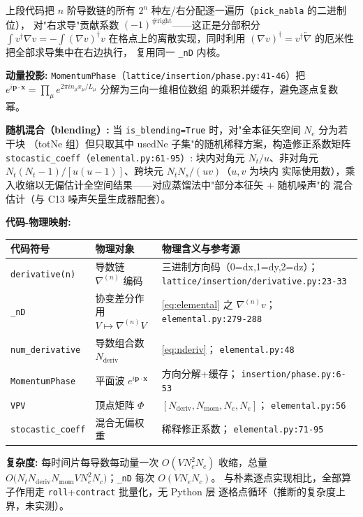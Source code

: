 \documentclass[UTF8]{ctexart}
\begin{document}
上段代码把 $n$ 阶导数链的所有 $2^n$ 种左/右分配逐一遍历（\texttt{pick\_nabla} 的二进制位），
对"右求导"贡献系数 $(-1)^{\#\text{right}}$——这正是分部积分
$\int v^\dagger \nabla v = -\int (\nabla v)^\dagger v$ 在格点上的离散实现，同时利用
$(\nabla v)^\dagger = v^\dagger \overleftarrow\nabla$ 的厄米性把全部求导集中在右边执行，
复用同一 \texttt{\_nD} 内核。

\textbf{动量投影:} \texttt{MomentumPhase}（\texttt{lattice/insertion/phase.py:41-46}）把
$e^{i\mathbf p\cdot\mathbf x} = \prod_\mu e^{2\pi i n_\mu x_\mu/L_\mu}$ 分解为三向一维相位数组
的乘积并缓存，避免逐点复数幂。

\textbf{随机混合（blending）:} 当 \texttt{is\_blending=True} 时，对"全本征矢空间 $N_e$ 分为若干块
（totNe 组）但只取其中 usedNe 子集"的随机稀释方案，构造修正系数矩阵
\texttt{stocastic\_coeff}（\texttt{elemental.py:61-95}）:
块内对角元 $N_t/u$、非对角元 $N_t(N_t-1)/[u(u-1)]$、跨块元 $N_tN_s/(uv)$（$u,v$ 为块内
实际使用数），乘入收缩以无偏估计全空间结果——对应蒸馏法中"部分本征矢 + 随机噪声"的
混合估计（与 C13 噪声矢量生成器配套）。

\begin{mapbox}
\textbf{代码-物理映射:}
\end{mapbox}
\begin{xltabular}{\textwidth}{llX}
\toprule
\textcolor{map}{代码符号} & 物理对象 & 物理含义与参考源 \\
\midrule
\endhead
\texttt{derivative(n)} & 导数链 $\nabla^{(n)}$ 编码 & 三进制方向码（0=dx,1=dy,2=dz）；
  \texttt{\nolinkurl{lattice/insertion/derivative.py:23-33}} \\
\texttt{\_nD} & 协变差分作用 $V\mapsto\nabla^{(n)}V$ & \eqref{eq:elemental} 之 $\nabla^{(n)}v$；
  \texttt{\nolinkurl{elemental.py:279-288}} \\
\texttt{num\_derivative} & 导数组合数 $N_{\text{deriv}}$ & \eqref{eq:nderiv}；
  \texttt{\nolinkurl{elemental.py:48}} \\
\texttt{MomentumPhase} & 平面波 $e^{i\mathbf p\cdot\mathbf x}$ & 方向分解+缓存；
  \texttt{\nolinkurl{insertion/phase.py:6-53}} \\
\texttt{VPV} & 顶点矩阵 $\Phi$ & $[N_{\text{deriv}}, N_{\text{mom}}, N_e, N_e]$；
  \texttt{\nolinkurl{elemental.py:56}} \\
\texttt{stocastic\_coeff} & 混合无偏权重 & 稀释修正系数；
  \texttt{\nolinkurl{elemental.py:71-95}} \\
\bottomrule
\end{xltabular}

\textbf{复杂度:} 每时间片每导数每动量一次 $O(V N_e^2 N_c)$ 收缩，总量
$O\big(N_t N_{\text{deriv}} N_{\text{mom}} V N_e^2 N_c\big)$；\texttt{\_nD} 每次 $O(V N_e N_c)$。
与朴素逐点实现相比，全部算子作用走 \texttt{roll}+\texttt{contract} 批量化，无 Python 层
逐格点循环（推断的复杂度上界，未实测）。
\end{document}
